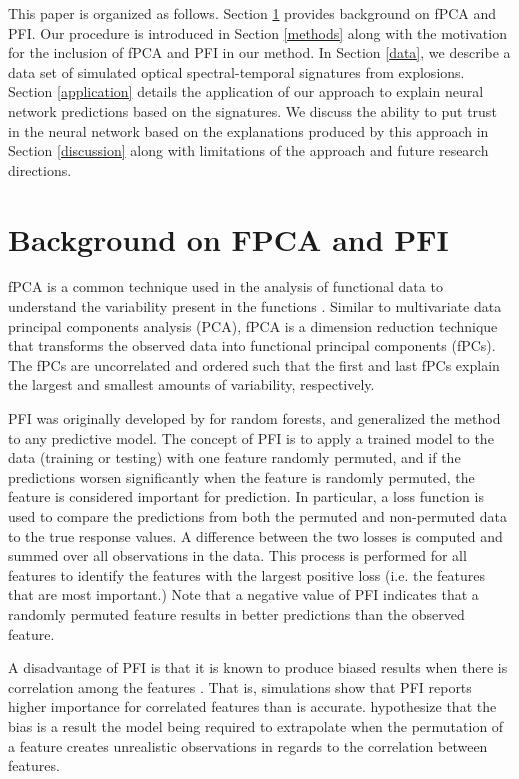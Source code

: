 \documentclass[letterpaper]{article}
\begin{document}
This paper is organized as follows. Section \ref{background} provides background on fPCA and PFI. Our procedure is introduced in Section \ref{methods} along with the motivation for the inclusion of fPCA and PFI in our method. In Section \ref{data}, we describe a data set of simulated optical spectral-temporal signatures from explosions. Section \ref{application} details the application of our approach to explain neural network predictions based on the signatures. We discuss the ability to put trust in the neural network based on the explanations produced by this approach in Section \ref{discussion} along with limitations of the approach and future research directions.

\section{Background on FPCA and PFI} \label{background}

fPCA is a common technique used in the analysis of functional data to understand the variability present in the functions \cite{ramsay:2005,wang:2016}. Similar to multivariate data principal components analysis (PCA), fPCA is a dimension reduction technique that transforms the observed data into functional principal components (fPCs). The fPCs are uncorrelated and ordered such that the first and last fPCs explain the largest and smallest amounts of variability, respectively.

PFI was originally developed by \citeauthor{breiman:2001}  for random forests, and \citeauthor{fisher:2019}  generalized the method to any predictive model. The concept of PFI is to apply a trained model to the data (training or testing) with one feature randomly permuted, and if the predictions worsen significantly when the feature is randomly permuted, the feature is considered important for prediction. In particular, a loss function is used to compare the predictions from both the permuted and non-permuted data to the true response values. A difference between the two losses is computed and summed over all observations in the data. This process is performed for all features to identify the features with the largest positive loss (i.e. the features that are most important.) Note that a negative value of PFI indicates that a randomly permuted feature results in better predictions than the observed feature. 

A disadvantage of PFI is that it is known to produce biased results when there is correlation among the features \cite{hooker:2019,nicodemus:2010,strobl:2007}. That is, simulations show that PFI reports higher importance for correlated features than is accurate. \citeauthor{hooker:2019}  hypothesize that the bias is a result the model being required to extrapolate when the permutation of a feature creates unrealistic observations in regards to the correlation between features.
\end{document}
